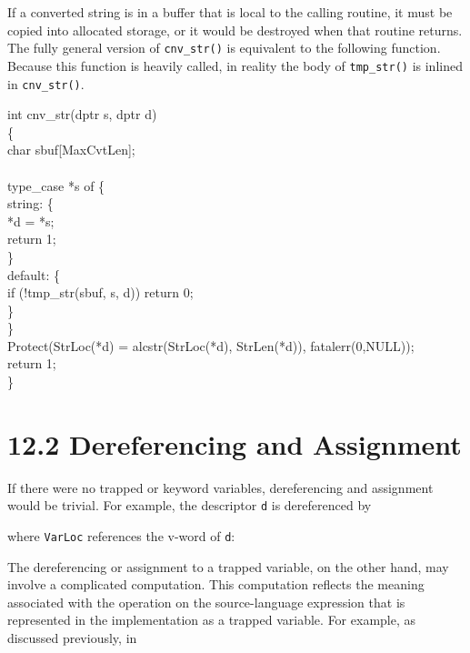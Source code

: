 If a converted string is in a buffer that is local to the calling
routine, it must be copied into allocated storage, or it would be
destroyed when that routine returns. The fully general version of
\texttt{cnv\_str()} is equivalent to the following function. Because
this function is heavily called, in reality the body of
\texttt{tmp\_str()} is inlined in \texttt{cnv\_str()}.

\begin{iconcode}
int cnv\_str(dptr s, dptr d)\\
\>\{\\
\>char sbuf[MaxCvtLen];\\
\\
\>type\_case *s of \{\\
\>\>string: \{\\
\>\>\>*d = *s;\\
\>\>\>return 1;\\
\>\>\>\}\\
\>\>default: \{\\
\>\>\>if (!tmp\_str(sbuf, s, d)) return 0;\\
\>\>\>\}\\
\>\>\}\\
\>Protect(StrLoc(*d) = alcstr(StrLoc(*d), StrLen(*d)), fatalerr(0,NULL));\\
\>return 1;\\
\>\}
\end{iconcode}


\section[12.2 Dereferencing and Assignment]{12.2 Dereferencing and Assignment}

If there were no trapped or keyword variables, dereferencing and assignment would
be trivial. For example, the descriptor \texttt{d} is dereferenced by


\noindent where \texttt{VarLoc} references the v-word of \texttt{d}:


The dereferencing or assignment to a trapped variable, on the other
hand, may involve a complicated computation. This computation reflects
the meaning associated with the operation on the source-language
expression that is represented in the implementation as a trapped
variable. For example, as discussed previously, in

